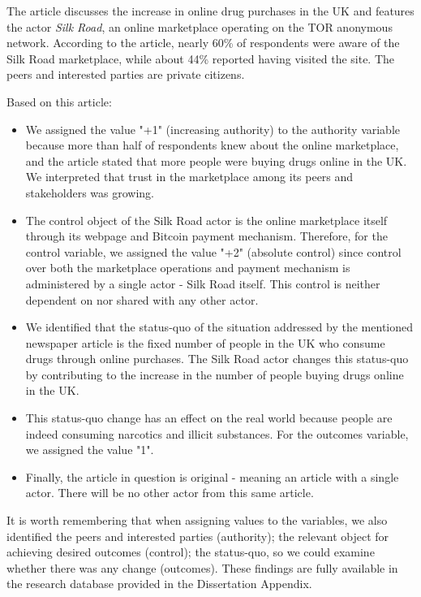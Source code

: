 The article discusses the increase in online drug purchases in the UK and features the actor \textit{Silk Road}, an online marketplace operating on the TOR anonymous network. According to the article, nearly 60\% of respondents were aware of the Silk Road marketplace, while about 44\% reported having visited the site. The peers and interested parties are private citizens.

Based on this article:
\begin{itemize}
    \item We assigned the value "+1" (increasing authority) to the authority variable because more than half of respondents knew about the online marketplace, and the article stated that more people were buying drugs online in the UK. We interpreted that trust in the marketplace among its peers and stakeholders was growing.
    
    \item The control object of the Silk Road actor is the online marketplace itself through its webpage and Bitcoin payment mechanism. Therefore, for the control variable, we assigned the value "+2" (absolute control) since control over both the marketplace operations and payment mechanism is administered by a single actor - Silk Road itself. This control is neither dependent on nor shared with any other actor.
    
    \item We identified that the status-quo of the situation addressed by the mentioned newspaper article is the fixed number of people in the UK who consume drugs through online purchases. The Silk Road actor changes this status-quo by contributing to the increase in the number of people buying drugs online in the UK.
    
    \item This status-quo change has an effect on the real world because people are indeed consuming narcotics and illicit substances. For the outcomes variable, we assigned the value "1".
    
    \item Finally, the article in question is original - meaning an article with a single actor. There will be no other actor from this same article.
\end{itemize}

It is worth remembering that when assigning values to the variables, we also identified the peers and interested parties (authority); the relevant object for achieving desired outcomes (control); the status-quo, so we could examine whether there was any change (outcomes). These findings are fully available in the research database provided in the Dissertation Appendix.

